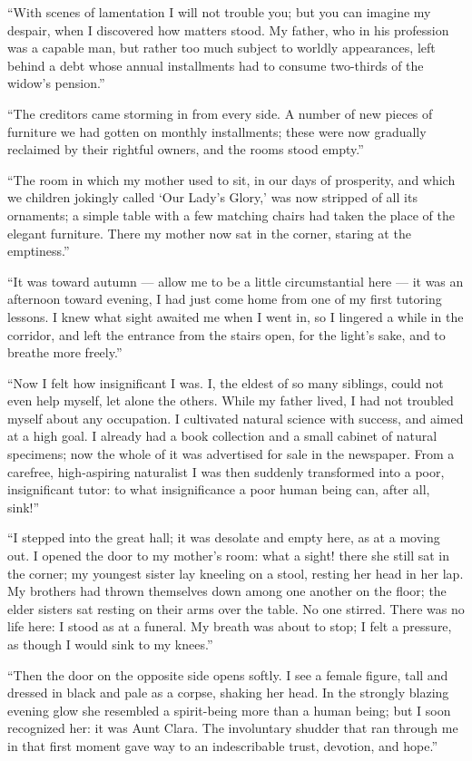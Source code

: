 \documentclass[12pt,a4paper]{book}
\begin{document}
``With scenes of lamentation I will not trouble you; but you can imagine my despair, when I discovered how matters stood. My father, who in his profession was a capable man, but rather too much subject to worldly appearances, left behind a debt whose annual installments had to consume two-thirds of the widow's pension.''

``The creditors came storming in from every side. A number of new pieces of furniture we had gotten on monthly installments; these were now gradually reclaimed by their rightful owners, and the rooms stood empty.''

``The room in which my mother used to sit, in our days of prosperity, and which we children jokingly called `Our Lady's Glory,' was now stripped of all its ornaments; a simple table with a few matching chairs had taken the place of the elegant furniture. There my mother now sat in the corner, staring at the emptiness.''

``It was toward autumn --- allow me to be a little
circumstantial here --- it was an afternoon toward evening, I had just come home from one of my first tutoring lessons. I knew what sight awaited me when I went in, so I lingered a while in the corridor, and left the entrance from the stairs open, for the light's sake, and to breathe more freely.''

``Now I felt how insignificant I was. I, the eldest of so many siblings, could not even help myself, let alone the others. While my father lived, I had not troubled myself about any occupation. I cultivated natural science with success, and aimed at a high goal. I already had a book collection and a small cabinet of natural specimens; now the whole of it was advertised for sale in the newspaper. From a carefree, high-aspiring naturalist I was then suddenly transformed into a poor, insignificant tutor: to what insignificance a poor human being can, after all, sink!''

``I stepped into the great hall; it was desolate and empty here, as at a moving out. I opened the door to my mother's room: what a sight! there she still sat in the corner; my youngest sister lay kneeling on a stool, resting her head in her lap. My brothers had thrown themselves down among one another on the floor; the elder sisters sat resting on their arms over the table. No one stirred. There was no life here: I stood as at a funeral. My breath was about to stop; I felt a pressure, as though I would sink to my knees.''

``Then the door on the opposite side opens softly. I see a female figure, tall and dressed in black and pale as a corpse, shaking her head. In the strongly blazing evening glow she resembled a spirit-being more than a human being; but I soon recognized her: it was Aunt Clara. The involuntary shudder that ran through me in that first moment gave way to an indescribable trust, devotion, and hope.''
\end{document}
